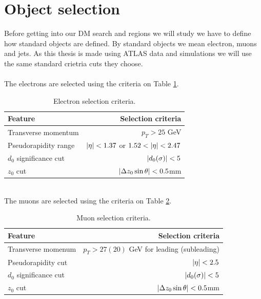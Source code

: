 \documentclass[14pt, a4paper]{book}
\begin{document}
\section{Object selection}\label{sec:obj_sel}
Before getting into our DM search and regions we will study we have to define how standard objects are defined. By standard objects we mean electron, muons and jets. As this thesis is made using ATLAS data and simulations we will use the same standard crietria 
cuts they choose.\\
\\The electrons are selected using the criteria on Table \ref{tab:E_selec}.
\begin{table}[!h]
    \centering\caption[Electron selection criteria]{Electron selection criteria.}
    \begin{tabular}{l|r}\midrule\midrule
        Feature                                                                 & Selection criteria        \\\midrule
        Transverse momentum                                                     & $p_T > 25$ GeV     \\
        Pseudorapidity range                                                    & $\abs{\eta}<1.37$ or  $1.52<\abs{\eta}<2.47$ \\
        $d_0$ significance cut                                                  & $\abs{d_0(\sigma)}<5$    \\
        $z_0$ cut                                                               & $\abs{\Delta z_0\sin\theta}<0.5$mm    \\\midrule\midrule
    \end{tabular}
    \label{tab:E_selec}
\end{table}
\\The muons are selected using the criteria on Table \ref{tab:mu_selec}.
\begin{table}[!h]
    \centering\caption[Muon selection criteria]{Muon selection criteria.}
    \begin{tabular}{l|r}\midrule\midrule
        Feature                                                                 & Selection criteria        \\\midrule
        Transverse momenum                                                      & $p_T > 27(20)$ GeV for leading (subleading)     \\
        Pseudorapidity cut                                                      & $\abs{\eta}<2.5$ \\
        $d_0$ significance cut                                                  & $\abs{d_0(\sigma)}<5$    \\
        $z_0$ cut                                                               & $\abs{\Delta z_0\sin\theta}<0.5$mm    \\\midrule\midrule
    \end{tabular}
    \label{tab:mu_selec}
\end{table}
\end{document}
